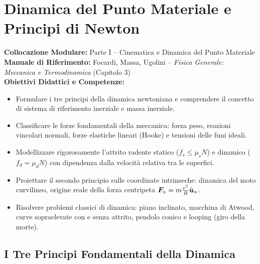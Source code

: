 \chapter{Dinamica del Punto Materiale e Principi di Newton}
\label{chap:dinamica_punto}

\begin{tcolorbox}[enhanced, breakable, colback=navyblue!4!white, colframe=navyblue!80!black,
    coltitle=white, fonttitle=\bfseries\sffamily, title={Quadro Sinottico del Capitolo 03},
    sharp corners, rounded corners=south, boxrule=1pt]
\textbf{Collocazione Modulare:} Parte I -- Cinematica e Dinamica del Punto Materiale\\
\textbf{Manuale di Riferimento:} Focardi, Massa, Ugolini -- \emph{Fisica Generale: Meccanica e Termodinamica} (Capitolo 3)\\
\textbf{Obiettivi Didattici e Competenze:}\par
\begin{itemize}
    \item Formulare i tre principi della dinamica newtoniana e comprendere il concetto di sistema di riferimento inerziale e massa inerziale.
    \item Classificare le forze fondamentali della meccanica: forza peso, reazioni vincolari normali, forze elastiche lineari (Hooke) e tensioni delle funi ideali.
    \item Modellizzare rigorosamente l'attrito radente statico ($f_s \le \mu_s N$) e dinamico ($f_d = \mu_d N$) con dipendenza dalla velocità relativa tra le superfici.
    \item Proiettare il secondo principio sulle coordinate intrinseche: dinamica del moto curvilineo, origine reale della forza centripeta $\bm{F}_n = m \frac{v^2}{R}\hat{\bm{u}}_n$.
    \item Risolvere problemi classici di dinamica: piano inclinato, macchina di Atwood, curve sopraelevate con e senza attrito, pendolo conico e looping (giro della morte).
\end{itemize}
\end{tcolorbox}

\vspace{0.5em}

\section{I Tre Principi Fondamentali della Dinamica}
\label{sec:principi_newton}

